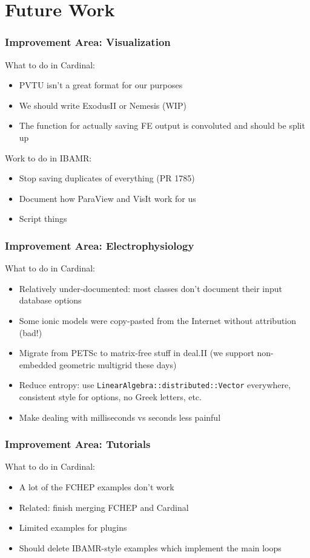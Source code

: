 \documentclass[8pt]{beamer}
\begin{document}
\section{Future Work}
\begin{frame}
  \frametitle{Improvement Area: Visualization}
  What to do in Cardinal:
  \begin{itemize}
    \item[$\blacksquare$] PVTU isn't a great format for our purposes
    \item[$\blacksquare$] We should write ExodusII or Nemesis (WIP)
    \item[$\blacksquare$] The function for actually saving FE output is convoluted and should be split up
  \end{itemize}
  \vfill

  Work to do in IBAMR:
  \begin{itemize}
    \item[$\blacksquare$] Stop saving duplicates of everything (PR 1785)
    \item[$\blacksquare$] Document how ParaView and VisIt work for us
    \item[$\blacksquare$] Script things
  \end{itemize}
\end{frame}

\begin{frame}
  \frametitle{Improvement Area: Electrophysiology}
  What to do in Cardinal:
  \begin{itemize}
    \item[$\blacksquare$] Relatively under-documented: most classes don't document their
      input database options
    \item[$\blacksquare$] Some ionic models were copy-pasted from the Internet without attribution (bad!)
    \item[$\blacksquare$] Migrate from PETSc to matrix-free stuff in deal.II (we support
      non-embedded geometric multigrid these days)
    \item[$\blacksquare$] Reduce entropy: use \texttt{LinearAlgebra::distributed::Vector} everywhere,
      consistent style for options, no Greek letters, etc.
    \item[$\blacksquare$] Make dealing with milliseconds vs seconds less painful
  \end{itemize}
\end{frame}

\begin{frame}
  \frametitle{Improvement Area: Tutorials}
  What to do in Cardinal:
  \begin{itemize}
    \item[$\blacksquare$] A lot of the FCHEP examples don't work
    \item[$\blacksquare$] Related: finish merging FCHEP and Cardinal
    \item[$\blacksquare$] Limited examples for plugins
    \item[$\blacksquare$] Should delete IBAMR-style examples which implement the main loops
  \end{itemize}
\end{frame}
\end{document}
